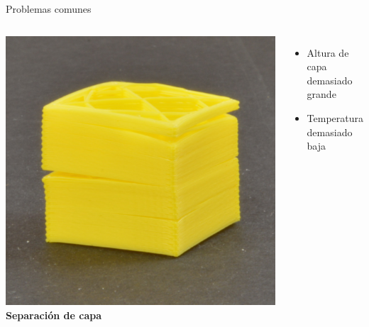 \documentclass{beamer}
\begin{document}
	\begin{frame}{Problemas comunes}
		\begin{columns}
				\includegraphics[width=\textwidth]{images/Layers-Splitting-Or-Cracking}
				\textbf{Separación de capa}
				\begin{itemize}
					\item Altura de capa demasiado grande
					\item Temperatura demasiado baja
				\end{itemize}
		\end{columns}
	\end{frame}
\end{document}
